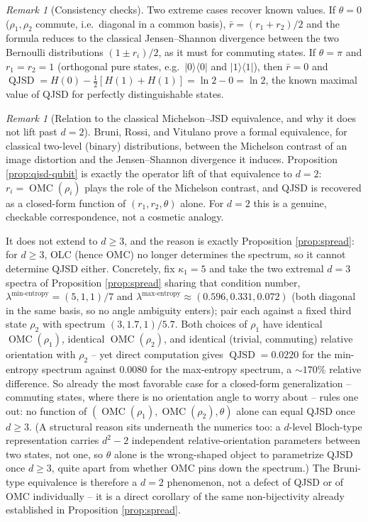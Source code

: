\documentclass{article}
\theoremstyle{remark}
\newtheorem{remark}[theorem]{Remark}
\providecommand{\QMC}{\operatorname{OMC}}
\begin{document}
\begin{remark}[Consistency checks]
Two extreme cases recover known values. If $\theta=0$ ($\rho_1,\rho_2$ commute, i.e.\ diagonal in a common basis), $\bar r=(r_1+r_2)/2$ and the formula reduces to the classical Jensen--Shannon divergence between the two Bernoulli distributions $(1\pm r_i)/2$, as it must for commuting states. If $\theta=\pi$ and $r_1=r_2=1$ (orthogonal pure states, e.g.\ $|0\rangle\langle0|$ and $|1\rangle\langle1|$), then $\bar r=0$ and $\operatorname{QJSD}=H(0)-\tfrac12[H(1)+H(1)]=\ln2-0=\ln2$, the known maximal value of QJSD for perfectly distinguishable states.
\end{remark}

\begin{remark}[Relation to the classical Michelson--JSD equivalence, and why it does not lift past $d=2$]\label{rem:bruni}
Bruni, Rossi, and Vitulano \cite{bruni2012} prove a formal equivalence, for classical two-level (binary) distributions, between the Michelson contrast of an image distortion and the Jensen--Shannon divergence it induces. Proposition \ref{prop:qjsd-qubit} is exactly the operator lift of that equivalence to $d=2$: $r_i=\QMC(\rho_i)$ plays the role of the Michelson contrast, and QJSD is recovered as a closed-form function of $(r_1,r_2,\theta)$ alone. For $d=2$ this is a genuine, checkable correspondence, not a cosmetic analogy.

It does not extend to $d\ge3$, and the reason is exactly Proposition \ref{prop:spread}: for $d\ge3$, OLC (hence OMC) no longer determines the spectrum, so it cannot determine QJSD either. Concretely, fix $\kappa_1=5$ and take the two extremal $d=3$ spectra of Proposition \ref{prop:spread} sharing that condition number, $\lambda^{\min\text{-entropy}}=(5,1,1)/7$ and $\lambda^{\max\text{-entropy}}\approx(0.596,0.331,0.072)$ (both diagonal in the same basis, so no angle ambiguity enters); pair each against a fixed third state $\rho_2$ with spectrum $(3,1.7,1)/5.7$. Both choices of $\rho_1$ have identical $\QMC(\rho_1)$, identical $\QMC(\rho_2)$, and identical (trivial, commuting) relative orientation with $\rho_2$ -- yet direct computation gives $\operatorname{QJSD}=0.0220$ for the min-entropy spectrum against $0.0080$ for the max-entropy spectrum, a $\sim\!170\%$ relative difference. So already the most favorable case for a closed-form generalization -- commuting states, where there is no orientation angle to worry about -- rules one out: no function of $(\QMC(\rho_1),\QMC(\rho_2),\theta)$ alone can equal QJSD once $d\ge3$. (A structural reason sits underneath the numerics too: a $d$-level Bloch-type representation carries $d^2-2$ independent relative-orientation parameters between two states, not one, so $\theta$ alone is the wrong-shaped object to parametrize QJSD once $d\ge3$, quite apart from whether OMC pins down the spectrum.) The Bruni-type equivalence is therefore a $d=2$ phenomenon, not a defect of QJSD or of OMC individually -- it is a direct corollary of the same non-bijectivity already established in Proposition \ref{prop:spread}.
\end{remark}
\end{document}
